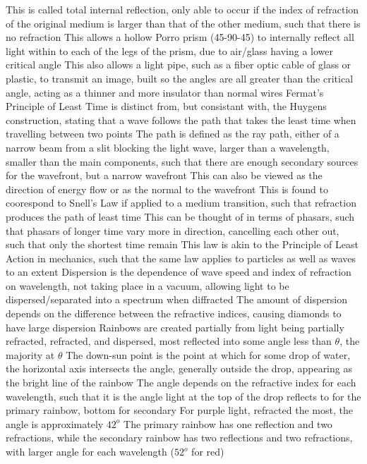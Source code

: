\documentclass[11 pt, twoside]{article}
\newenvironment{outline*}
{
	\begin{outline}[enumerate]
	}
	{\end{outline}
}
\begin{document}
\begin{outline*}
\3 This is called total internal reflection, only able to occur if the index of refraction of the original medium is larger than that of the other medium, such that there is no refraction
\3 This allows a hollow Porro prism (45-90-45) to internally reflect all light within to each of the legs of the prism, due to air/glass having a lower critical angle
\3 This also allows a light pipe, such as a fiber optic cable of glass or plastic, to transmit an image, built so the angles are all greater than the critical angle, acting as a thinner and more insulator than normal wires
\1 Fermat's Principle of Least Time is distinct from, but consistant with, the Huygens construction, stating that a wave follows the path that takes the least time when travelling between two points
\2 The path is defined as the ray path, either of a narrow beam from a slit blocking the light wave, larger than a wavelength, smaller than the main components, such that there are enough secondary sources for the wavefront, but a narrow wavefront
\3 This can also be viewed as the direction of energy flow or as the normal to the wavefront
\2 This is found to coorespond to Snell's Law if applied to a medium transition, such that refraction produces the path of least time
\3 This can be thought of in terms of phasars, such that phasars of longer time vary more in direction, cancelling each other out, such that only the shortest time remain
\2 This law is akin to the Principle of Least Action in mechanics, such that the same law applies to particles as well as waves to an extent
\1 Dispersion is the dependence of wave speed and index of refraction on wavelength, not taking place in a vacuum, allowing light to be dispersed/separated into a spectrum when diffracted
\2 The amount of dispersion depends on the difference between the refractive indices, causing diamonds to have large dispersion
\1 Rainbows are created partially from light being partially refracted, refracted, and dispersed, most reflected into some angle less than $\theta$, the majority at $\theta$
\2 The down-sun point is the point at which for some drop of water, the horizontal axis intersects the angle, generally outside the drop, appearing as the bright line of the rainbow
\3 The angle depends on the refractive index for each wavelength, such that it is the angle light at the top of the drop reflects to for the primary rainbow, bottom for secondary
\3 For purple light, refracted the most, the angle is approximately $42^o$
\2 The primary rainbow has one reflection and two refractions, while the secondary rainbow has two reflections and two refractions, with larger angle for each wavelength ($52^o$ for red)

\end{outline*}
\end{document}
